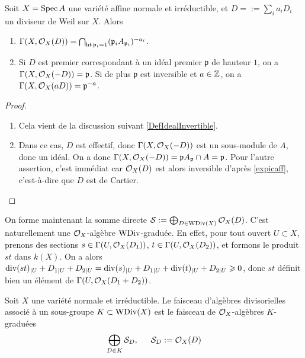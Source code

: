 \begin{prop}\label{divaff}
Soit $X=\operatorname{Spec} A$ une variété affine normale et irréductible, et $D=:=\sum_i a_iD_i$ un diviseur de Weil sur $X$. Alors
\begin{enumerate}
\item $\Gamma(X,\mathcal{O}_X(D))=\bigcap_{\operatorname{ht} \mathfrak{p}_i=1}(\mathfrak{p}_iA_{\mathfrak{p}_i})^{-a_i}$.
\item Si $D$ est premier correspondant à un idéal premier $\mathfrak{p}$ de hauteur $1$, on a $\Gamma(X,\mathcal{O}_X(-D))=\mathfrak{p}$. Si de plus $\mathfrak{p}$ est inversible et $a\in \mathbb{Z}$, on a $\Gamma(X,\mathcal{O}_X(aD))=\mathfrak{p}^{-a}$.
\end{enumerate}
\end{prop}
\begin{proof}
\begin{enumerate}
\item Cela vient de la discussion suivant \ref{DefIdealInvertible}.
\item Dans ce cas, $D$ est effectif, donc $\Gamma(X,\mathcal{O}_X(-D))$ est un sous-module de $A$, donc un idéal. On a donc $\Gamma(X,\mathcal{O}_X(-D))=\mathfrak{p}A_\mathfrak{p}\cap A=\mathfrak{p}$. Pour l'autre assertion, c'est immédiat car $\mathcal{O}_X(D)$ est alors inversible d'après \ref{expicaff}, c'est-à-dire que $D$ est de Cartier.
\end{enumerate}
\end{proof}

On forme maintenant la somme directe $\mathcal{S}:=\bigoplus_{D\in \operatorname{WDiv}(X)}\mathcal{O}_X(D)$. C'est naturellement une $\mathcal{O}_X$-algèbre $\operatorname{WDiv}$-graduée. En effet, pour tout ouvert $U\subset X$, prenons des sections $s\in\Gamma(U,\mathcal{O}_X(D_1))$, $t\in \Gamma(U,\mathcal{O}_X(D_2))$, et formons le produit $st$ dans $k(X)$. On a alors $\operatorname{div}(st)_{|U}+D_{1|U}+D_{2|U}=\operatorname{div}(s)_{|U}+D_{1|U}+\operatorname{div}(t)_{|U}+D_{2|U}\geqslant 0$, donc $st$ définit bien un élément de $\Gamma(U,\mathcal{O}_X(D_1+D_2))$.

\begin{defn}
Soit $X$ une variété normale et irréductible. Le faisceau d'algèbres divisorielles associé à un sous-groupe $K\subset \operatorname{WDiv}(X)$ est le faisceau de $\mathcal{O}_X$-algèbres $K$-graduées $$\bigoplus_{D\in K}\mathcal{S}_D,\,\,\,\,\,\,\,\,\, \mathcal{S}_D:=\mathcal{O}_X(D)$$ 
\end{defn}


